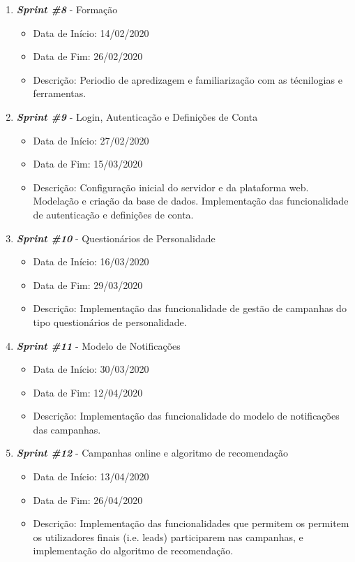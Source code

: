 \begin{enumerate}
	\item \textit{\textbf{Sprint \#8}} - Formação
	\begin{itemize}
		\item Data de Início: 14/02/2020
		\item Data de Fim: 26/02/2020
		\item Descrição: Periodio de apredizagem e familiarização com as técnilogias e ferramentas.
	\end{itemize}
	\item \textit{\textbf{Sprint \#9}} - Login, Autenticação e Definições de Conta
	\begin{itemize}
		\item Data de Início: 27/02/2020
		\item Data de Fim: 15/03/2020
		\item Descrição: Configuração inicial do servidor e da plataforma web. Modelação e criação da base de dados. Implementação das funcionalidade de autenticação e definições de conta.
	\end{itemize}
	\item \textit{\textbf{Sprint \#10}} - Questionários de Personalidade
	\begin{itemize}
		\item Data de Início: 16/03/2020
		\item Data de Fim: 29/03/2020
		\item Descrição: Implementação das funcionalidade de gestão de campanhas do tipo questionários de personalidade. 
	\end{itemize}
	\item \textit{\textbf{Sprint \#11}} - Modelo de Notificações
	\begin{itemize}
		\item Data de Início: 30/03/2020
		\item Data de Fim: 12/04/2020
		\item Descrição: Implementação das funcionalidade do modelo de notificações das campanhas.
	\end{itemize}
	\item \textit{\textbf{Sprint \#12}} - Campanhas online e algoritmo de recomendação
	\begin{itemize}
		\item Data de Início: 13/04/2020
		\item Data de Fim: 26/04/2020
		\item Descrição: Implementação das funcionalidades que permitem os permitem os utilizadores finais (i.e. leads) participarem nas campanhas, e implementação do algoritmo de recomendação.

\end{itemize}
\end{enumerate}
